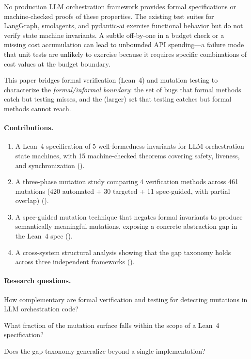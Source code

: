 \documentclass[11pt,a4paper]{article}
\begin{document}
No production LLM orchestration framework provides formal
specifications or machine-checked proofs of these properties. The
existing test suites for LangGraph, smolagents, and pydantic-ai
exercise functional behavior but do not verify state machine
invariants. A subtle off-by-one in a budget check or a missing cost
accumulation can lead to unbounded API spending---a failure mode that
unit tests are unlikely to exercise because it requires specific
combinations of cost values at the budget boundary.

This paper bridges formal verification (Lean~4) and mutation testing
to characterize the \emph{formal/informal boundary}: the set of bugs
that formal methods catch but testing misses, and the (larger) set
that testing catches but formal methods cannot reach.

\paragraph{Contributions.}
\begin{enumerate}[leftmargin=*,nosep]
  \item A Lean~4 specification of 5 well-formedness invariants for
        LLM orchestration state machines, with 15 machine-checked
        theorems covering safety, liveness, and synchronization
        ().
  \item A three-phase mutation study comparing 4 verification
        methods across 461 mutations (420 automated + 30 targeted
        + 11 spec-guided, with partial overlap)
        ().
  \item A spec-guided mutation technique that negates formal
        invariants to produce semantically meaningful mutations,
        exposing a concrete abstraction gap in the Lean~4 spec
        ().
  \item A cross-system structural analysis showing that the gap
        taxonomy holds across three independent frameworks
        ().
\end{enumerate}

\paragraph{Research questions.}
\begin{description}[leftmargin=*,nosep]
  \item[RQ1] How complementary are formal verification and
    testing for detecting mutations in LLM orchestration code?
  \item[RQ2] What fraction of the mutation surface falls within the
    scope of a Lean~4 specification?
  \item[RQ3] Does the gap taxonomy generalize beyond a single
    implementation?
\end{description}
\end{document}
